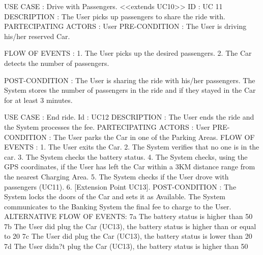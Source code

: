 \documentclass[12pt]{article}
\begin{document}
USE CASE : Drive with Passengers.  <<extends UC10>>
ID : UC 11
DESCRIPTION : The User picks up passengers to share the ride with.
PARTECIPATING ACTORS : User
PRE-CONDITION : The User is driving his/her reserved Car.

FLOW OF EVENTS : 
1. The User picks up the desired passengers.
2. The Car detects the number of passengers.

POST-CONDITION :  
The User is sharing the ride with his/her passengers.
The System stores the number of passengers in the ride and if they stayed in the Car for at least 3 minutes.

USE CASE : End ride.
Id : UC12
DESCRIPTION : The User ends the ride and the System processes the fee.
PARTECIPATING ACTORS : User 
PRE-CONDITION : The User parks the Car in one of the Parking Areas.
FLOW OF EVENTS : 
1. The User exits the Car.
2. The System verifies that no one is in the car.
3. The System checks the battery status. 
4. The System checks, using the GPS coordinates, if the User has left the Car within a 3KM distance range from the nearest Charging Area.
5. The System checks if the User drove with passengers (UC11).
6. [Extension Point UC13].
POST-CONDITION :  
The System locks the doors of the Car and sets it as Available.
The System communicates to the Banking System the final fee to charge to the User.
ALTERNATIVE FLOW OF EVENTS:
7a 	The battery status is higher than 50%
7b The User did plug the Car (UC13), the battery status is higher than or equal to 20%
7c The User did plug the Car (UC13), the battery status is lower than 20%
7d The User didn?t plug the Car (UC13), the battery status is higher than 50%
\end{document}

